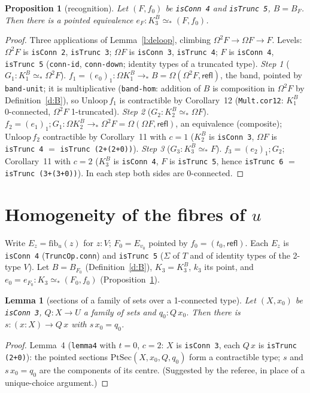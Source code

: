 \documentclass[11pt]{amsart}
\newtheorem{proposition}[theorem]{Proposition}
\newtheorem{lemma}[theorem]{Lemma}
\theoremstyle{definition}
\theoremstyle{remark}
\newcommand{\Om}{\Omega}
\newcommand{\code}[1]{\texttt{#1}}
\newcommand{\refl}{\mathsf{refl}}
\newcommand{\fib}{\mathrm{fib}}
\begin{document}
\begin{proposition}[recognition]\label{p:rec}
Let $(F,f_0)$ be \code{isConn 4} and \code{isTrunc 5}, $B=B_F$. Then there
is a pointed equivalence $e_F:K^B_3\simeq_*(F,f_0)$.
\end{proposition}
\begin{proof}
Three applications of Lemma~\ref{l:deloop}, climbing
$\Om^2F\to\Om F\to F$. Levels: $\Om^2F$ is \code{isConn 2}, \code{isTrunc
3}; $\Om F$ is \code{isConn 3}, \code{isTrunc 4}; $F$ is \code{isConn 4},
\code{isTrunc 5} (\code{conn-id}, \code{conn-down}; identity types of a
truncated type).
\emph{Step 1} ($G_1:K^B_1\simeq_*\Om^2F$). $f_1=(e_0)_1:\Om K^B_1\to_*B=\Om(\Om^2F,\refl)$,
the band, pointed by \code{band-unit}; it is multiplicative
(\code{band-hom}: addition of $B$ is composition in $\Om^2F$ by
Definition~\ref{d:B}), so $\mathrm{Unloop}\,f_1$ is contractible by
Corollary~12 (\code{Mult.cor12}: $K^B_1$ 0-connected, $\Om^2F$ 1-truncated).
\emph{Step 2} ($G_2:K^B_2\simeq_*\Om F$). $f_2=(e_1)_1;G_1:\Om K^B_2\to_*\Om^2F=\Om(\Om F,\refl)$,
an equivalence (composite); $\mathrm{Unloop}\,f_2$ contractible by
Corollary~11 with $c=1$ ($K^B_2$ is \code{isConn 3}, $\Om F$ is
\code{isTrunc 4} $=$ \code{isTrunc (2+(2+0))}).
\emph{Step 3} ($G_3:K^B_3\simeq_*F$). $f_3=(e_2)_1;G_2$; Corollary~11 with
$c=2$ ($K^B_3$ is \code{isConn 4}, $F$ is \code{isTrunc 5}, hence
\code{isTrunc 6} $=$ \code{isTrunc (3+(3+0))}).
In each step both sides are 0-connected.
\end{proof}

\section{Homogeneity of the fibres of $u$}

Write $E_z=\fib_u(z)$ for $z:V$; $F_0=E_{v_0}$ pointed by
$f_0=(t_0,\refl)$. Each $E_z$ is \code{isConn 4} (\code{TruncOp.conn}) and
\code{isTrunc 5} ($\Sigma$ of $T$ and of identity types of the 2-type $V$).
Let $B=B_{F_0}$ (Definition~\ref{d:B}), $K_3=K^B_3$, $k_3$ its point, and
$e_0=e_{F_0}:K_3\simeq_*(F_0,f_0)$ (Proposition~\ref{p:rec}).

\begin{lemma}[sections of a family of sets over a 1-connected type]\label{l:ext}
Let $(X,x_0)$ be \code{isConn 3}, $Q:X\to U$ a family of sets and $q_0:Q\,x_0$.
Then there is $s:(x:X)\to Q\,x$ with $s\,x_0=q_0$.
\end{lemma}
\begin{proof}
Lemma~4 (\code{lemma4} with $t=0$, $c=2$: $X$ is \code{isConn 3}, each
$Q\,x$ is \code{isTrunc (2+0)}): the pointed sections
$\mathrm{PtSec}(X,x_0,Q,q_0)$ form a contractible type; $s$ and $s\,x_0=q_0$
are the components of its centre. (Suggested by the referee, in place of
a unique-choice argument.)
\end{proof}
\end{document}
